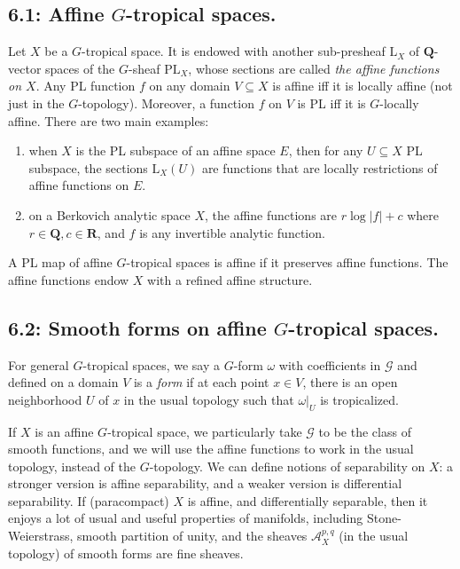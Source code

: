 \documentclass[12pt,reqno]{amsart}
\theoremstyle{definition}
\theoremstyle{remark}
\theoremstyle{citedrem}
\theoremstyle{cited}
\theoremstyle{citeddef}
\theoremstyle{step}
\begin{document}
\subsection*{6.1: Affine $G$-tropical spaces.} Let $X$ be a $G$-tropical space. It is endowed with another sub-presheaf $\mathrm{L}_X$ of $\mathbf{Q}$-vector spaces of the $G$-sheaf $\mathrm{PL}_X$, whose sections are called \emph{the affine functions on $X$}. Any PL function $f$ on any domain $V \subseteq X$ is affine iff it is locally affine (not just in the $G$-topology). Moreover, a function $f$ on $V$ is PL iff it is $G$-locally affine. There are two main examples: 

\begin{enumerate}
    \item when $X$ is the PL subspace of an affine space $E$, then for any $U \subseteq X$ PL subspace, the sections $\mathrm{L}_X(U)$ are functions that are locally restrictions of affine functions on $E$. 
    \item on a Berkovich analytic space $X$, the affine functions are $r \log|f| + c$ where $r \in \mathbf{Q}, c \in \mathbf{R}$, and $f$ is any invertible analytic function. 
\end{enumerate}

A PL map of affine $G$-tropical spaces is affine if it preserves affine functions. The affine functions endow $X$ with a refined affine structure. 

\subsection*{6.2: Smooth forms on affine $G$-tropical spaces. }
For general $G$-tropical spaces, we say a $G$-form $\omega$ with coefficients in $\mathcal{G}$ and defined on a domain $V$ is a \emph{form} if at each point $x \in V$, there is an open neighborhood $U$ of $x$ in the usual topology such that $\omega|_U$ is tropicalized. 

If $X$ is an affine $G$-tropical space, we particularly take $\mathcal{G}$ to be the class of smooth functions, and we will use the affine functions to work in the usual topology, instead of the $G$-topology. We can define notions of separability on $X$: a stronger version is affine separability, and a weaker version is differential separability. If (paracompact) $X$ is affine, and differentially separable, then it enjoys a lot of usual and useful properties of manifolds, including Stone-Weierstrass, smooth partition of unity, and the sheaves $\mathcal{A}^{p,q}_X$ (in the usual topology) of smooth forms are fine sheaves. 
\end{document}
